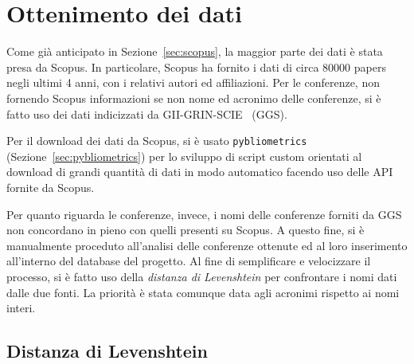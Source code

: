 \section{Ottenimento dei dati}

Come già anticipato in Sezione~\ref{sec:scopus}, la maggior parte dei dati è
stata presa da Scopus. In particolare, Scopus ha fornito i dati di circa 80000
papers negli ultimi 4 anni, con i relativi autori ed affiliazioni.
Per le conferenze, non fornendo Scopus informazioni se non nome ed acronimo
delle conferenze, si è fatto uso dei dati indicizzati da GII-GRIN-SCIE~\cite{giigrinscie} (GGS).

Per il download dei dati da Scopus, si è usato \texttt{pybliometrics}
(Sezione~\ref{sec:pybliometrics}) per lo sviluppo di script custom orientati
al download di grandi quantità di dati in modo automatico facendo uso delle
API fornite da Scopus.

Per quanto riguarda le conferenze, invece, i nomi delle conferenze forniti da
GGS non concordano in pieno con quelli presenti su Scopus. A questo fine,
si è manualmente proceduto all'analisi delle conferenze ottenute ed al loro
inserimento all'interno del database del progetto.
Al fine di semplificare e velocizzare il processo, si è fatto uso della
\textit{distanza di Levenshtein} per confrontare i nomi dati dalle due fonti.
La priorità è stata comunque data agli acronimi rispetto ai nomi interi.

\subsection{Distanza di Levenshtein}

